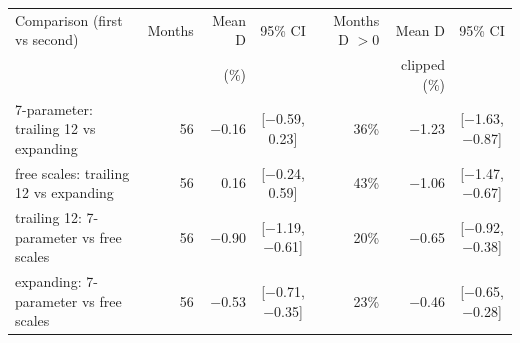 \begin{tabular}{lrrcrrc}
\toprule
Comparison (first vs second) & Months & Mean D & 95\% CI & Months D \(>0\) & Mean D & 95\% CI \\
 &  & (\%) &  &  & clipped (\%) &  \\
\midrule
7-parameter: trailing 12 vs expanding & 56 & $-$0.16 & [$-$0.59, 0.23] & 36\% & $-$1.23 & [$-$1.63, $-$0.87] \\
free scales: trailing 12 vs expanding & 56 & 0.16 & [$-$0.24, 0.59] & 43\% & $-$1.06 & [$-$1.47, $-$0.67] \\
trailing 12: 7-parameter vs free scales & 56 & $-$0.90 & [$-$1.19, $-$0.61] & 20\% & $-$0.65 & [$-$0.92, $-$0.38] \\
expanding: 7-parameter vs free scales & 56 & $-$0.53 & [$-$0.71, $-$0.35] & 23\% & $-$0.46 & [$-$0.65, $-$0.28] \\
\bottomrule
\end{tabular}
